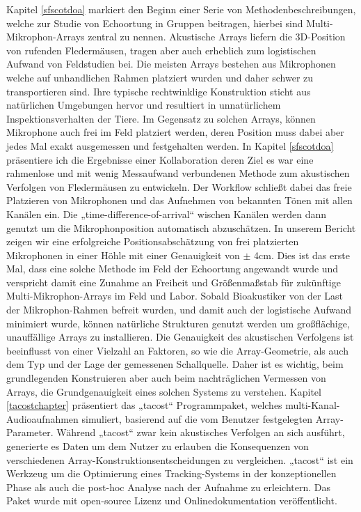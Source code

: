\documentclass[
]{book}
\begin{document}
Kapitel \ref{sfscotdoa} markiert den Beginn einer Serie von Methodenbeschreibungen, welche zur Studie von Echoortung in Gruppen beitragen, hierbei sind Multi-Mikrophon-Arrays zentral zu nennen. Akustische Arrays liefern die 3D-Position von rufenden Fledermäusen, tragen aber auch erheblich zum logistischen Aufwand von Feldstudien bei. Die meisten Arrays bestehen aus Mikrophonen welche auf unhandlichen Rahmen platziert wurden und daher schwer zu transportieren sind. Ihre typische rechtwinklige Konstruktion sticht aus natürlichen Umgebungen hervor und resultiert in unnatürlichem Inspektionsverhalten der Tiere. Im Gegensatz zu solchen Arrays, können Mikrophone auch frei im Feld platziert werden, deren Position muss dabei aber jedes Mal exakt ausgemessen und festgehalten werden. In Kapitel \ref{sfscotdoa} präsentiere ich die Ergebnisse einer Kollaboration deren Ziel es war eine rahmenlose und mit wenig Messaufwand verbundenen Methode zum akustischen Verfolgen von Fledermäusen zu entwickeln. Der Workflow schließt dabei das freie Platzieren von Mikrophonen und das Aufnehmen von bekannten Tönen mit allen Kanälen ein. Die „time-difference-of-arrival`` wischen Kanälen werden dann genutzt um die Mikrophonposition automatisch abzuschätzen. In unserem Bericht zeigen wir eine erfolgreiche Positionsabschätzung von frei platzierten Mikrophonen in einer Höhle mit einer Genauigkeit von \(\pm\) 4cm. Dies ist das erste Mal, dass eine solche Methode im Feld der Echoortung angewandt wurde und verspricht damit eine Zunahme an Freiheit und Größenmaßstab für zukünftige Multi-Mikrophon-Arrays im Feld und Labor. Sobald Bioakustiker von der Last der Mikrophon-Rahmen befreit wurden, und damit auch der logistische Aufwand minimiert wurde, können natürliche Strukturen genutzt werden um großflächige, unauffällige Arrays zu installieren.
Die Genauigkeit des akustischen Verfolgens ist beeinflusst von einer Vielzahl an Faktoren, so wie die Array-Geometrie, als auch dem Typ und der Lage der gemessenen Schallquelle. Daher ist es wichtig, beim grundlegenden Konstruieren aber auch beim nachträglichen Vermessen von Arrays, die Grundgenauigkeit eines solchen Systems zu verstehen. Kapitel \ref{tacostchapter} präsentiert das „tacost`` Programmpaket, welches multi-Kanal-Audioaufnahmen simuliert, basierend auf die vom Benutzer festgelegten Array-Parameter. Während „tacost`` zwar kein akustisches Verfolgen an sich ausführt, generierte es Daten um dem Nutzer zu erlauben die Konsequenzen von verschiedenen Array-Konstruktionsentscheidungen zu vergleichen. „tacost`` ist ein Werkzeug um die Optimierung eines Tracking-Systems in der konzeptionellen Phase als auch die post-hoc Analyse nach der Aufnahme zu erleichtern. Das Paket wurde mit open-source Lizenz und Onlinedokumentation veröffentlicht.
\end{document}
